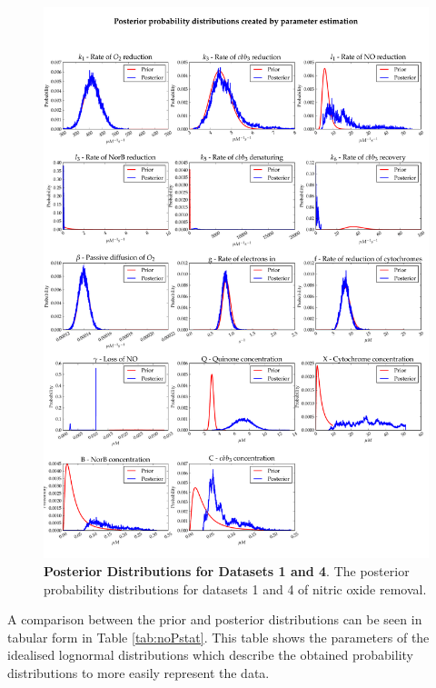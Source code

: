 \begin{figure}[p]
 \centering
 \includegraphics[width=15cm, trim=0cm 0cm 0cm 0cm]{./06-noreduction/data/posteriors-redo2.pdf}
 \caption[Posterior Distributions for Datasets 1 and 4]{{\bf Posterior Distributions for Datasets 1 and 4}. The posterior probability distributions for datasets 1 and 4 of nitric oxide removal.
 \label{fig:redoneposterior2}}
\end{figure}
A comparison between the prior and posterior distributions can be seen in tabular form in Table \ref{tab:noPstat}. This table shows the parameters of the idealised lognormal distributions which describe the obtained probability distributions to more easily represent the data.

